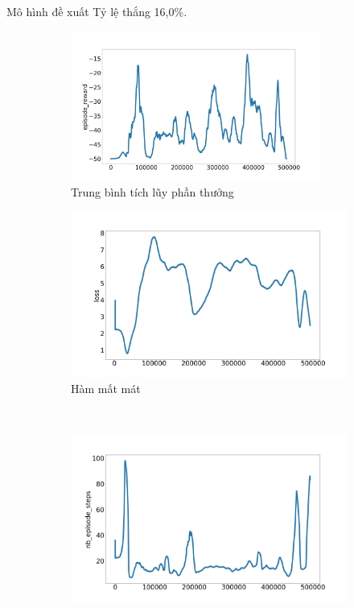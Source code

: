 \documentclass{beamer}
\begin{document}
\begin{frame}{Mô hình đề xuất}
Tỷ lệ thắng 16,0\%.
    \begin{figure}[ht]
    	\centering
    	\begin{subfigure}{.5\textwidth}
    		\includegraphics[width=0.9\textwidth]{Pic/baseline/episode_reward.png}  
    		\caption{Trung bình tích lũy phần thưởng}
    		\label{fig:baseline_avg}
    	\end{subfigure}%
    	\begin{subfigure}{.5\textwidth}
    		\includegraphics[width=.9\textwidth]{Pic/baseline/loss.png}  
    		\caption{Hàm mất mát}
    		\label{fig:baseline_loss}
    	\end{subfigure}\\
    	\begin{subfigure}{.5\textwidth}
    		\includegraphics[width=.9\textwidth]{Pic/baseline/nb_episode_steps.png}

\end{subfigure}
\end{figure}
\end{frame}
\end{document}
